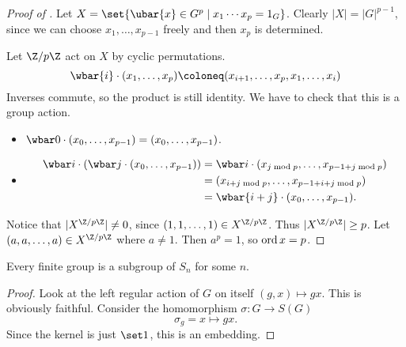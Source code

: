 \begin{proof}[Proof of ]
    Let $X = \set{\ubar{x} \in G^p \mid x_1 \cdots x_p = 1_G}$.
    Clearly $|X| = |G|^{p-1}$, since we can choose $x_1, \ldots, x_{p-1}$
    freely and then $x_p$ is determined.

    Let $\Z/p\Z$ act on $X$ by cyclic permutations. \[
        \wbar{i} \cdot (x_1, \dots, x_p)
            \coloneq (x_{i+1}, \dots, x_p, x_1, \dots, x_i)
    \] Inverses commute, so the product is still identity.
    We have to check that this is a group action.
    \begin{itemize}
        \item $\wbar 0 \cdot (x_0, \dots, x_{p-1}) = (x_0, \dots, x_{p-1})$.
        \item \begin{align*}
            \wbar i \cdot (\wbar j \cdot (x_0, \dots, x_{p-1}))
            &= \wbar i \cdot (x_{j \bmod p}, \dots, x_{p-1+j \bmod p}) \\
            &= (x_{i+j \bmod p}, \dots, x_{p-1+i+j \bmod p}) \\
            &= \wbar{i+j} \cdot (x_0, \dots, x_{p-1}).
        \end{align*}
    \end{itemize}

    Notice that $|X^{\Z/p\Z}| \ne 0$, since
    $(1, 1, \dots, 1) \in X^{\Z/p\Z}$.
    Thus $|X^{\Z/p\Z}| \ge p$.
    Let $(a, a, \dots, a) \in X^{\Z/p\Z}$ where $a \ne 1$.
    Then $a^p = 1$, so $\operatorname{ord} x = p$.
\end{proof}

\begin{corollary*}
    Every finite group is a subgroup of $S_n$ for some $n$.
\end{corollary*}
\begin{proof}
    Look at the left regular action of $G$ on itself
    $(g, x) \mapsto gx$.
    This is obviously faithful.
    Consider the homomorphism $\sigma \colon G \to S(G)$ \[
        \sigma_g = x \mapsto gx.
    \] Since the kernel is just $\set 1$, this is an embedding.
\end{proof}

